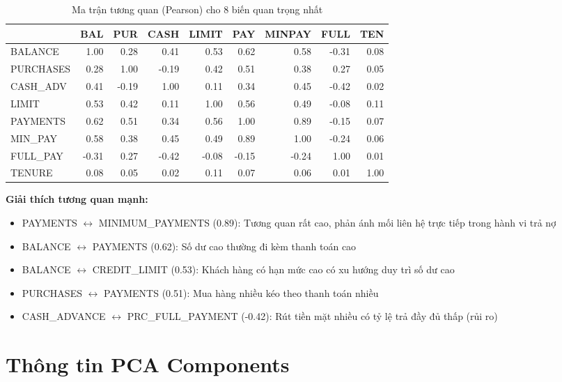 \begin{table}[H]
\centering
\caption{Ma trận tương quan (Pearson) cho 8 biến quan trọng nhất}
\small
\begin{tabular}{|l|r|r|r|r|r|r|r|r|}
\hline
 & \textbf{BAL} & \textbf{PUR} & \textbf{CASH} & \textbf{LIMIT} & \textbf{PAY} & \textbf{MINPAY} & \textbf{FULL} & \textbf{TEN} \\
\hline
BALANCE & 1.00 & 0.28 & 0.41 & 0.53 & 0.62 & 0.58 & -0.31 & 0.08 \\
\hline
PURCHASES & 0.28 & 1.00 & -0.19 & 0.42 & 0.51 & 0.38 & 0.27 & 0.05 \\
\hline
CASH\_ADV & 0.41 & -0.19 & 1.00 & 0.11 & 0.34 & 0.45 & -0.42 & 0.02 \\
\hline
LIMIT & 0.53 & 0.42 & 0.11 & 1.00 & 0.56 & 0.49 & -0.08 & 0.11 \\
\hline
PAYMENTS & 0.62 & 0.51 & 0.34 & 0.56 & 1.00 & 0.89 & -0.15 & 0.07 \\
\hline
MIN\_PAY & 0.58 & 0.38 & 0.45 & 0.49 & 0.89 & 1.00 & -0.24 & 0.06 \\
\hline
FULL\_PAY & -0.31 & 0.27 & -0.42 & -0.08 & -0.15 & -0.24 & 1.00 & 0.01 \\
\hline
TENURE & 0.08 & 0.05 & 0.02 & 0.11 & 0.07 & 0.06 & 0.01 & 1.00 \\
\hline
\end{tabular}
\end{table}

\textbf{Giải thích tương quan mạnh:}
\begin{itemize}
    \item PAYMENTS $\leftrightarrow$ MINIMUM\_PAYMENTS (0.89): Tương quan rất cao, phản ánh mối liên hệ trực tiếp trong hành vi trả nợ
    \item BALANCE $\leftrightarrow$ PAYMENTS (0.62): Số dư cao thường đi kèm thanh toán cao
    \item BALANCE $\leftrightarrow$ CREDIT\_LIMIT (0.53): Khách hàng có hạn mức cao có xu hướng duy trì số dư cao
    \item PURCHASES $\leftrightarrow$ PAYMENTS (0.51): Mua hàng nhiều kéo theo thanh toán nhiều
    \item CASH\_ADVANCE $\leftrightarrow$ PRC\_FULL\_PAYMENT (-0.42): Rút tiền mặt nhiều có tỷ lệ trả đầy đủ thấp (rủi ro)
\end{itemize}

\section{Thông tin PCA Components}

